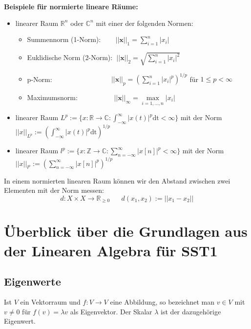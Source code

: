 \documentclass[11pt]{article}
\begin{document}
\textbf{Beispiele für normierte lineare Räume:}
\vspace*{-0.5cm}
\begin{itemize}
    \item linearer Raum $\mathbb{R}^n$ oder $\mathbb{C}^n$ mit einer der folgenden Normen: \begin{itemize}
        \item[] Summennorm (1-Norm): $\hspace{22pt}||\mathbf{x}||_1 = \sum_{i=1}^n |x_i|$
        \item[] Euklidische Norm (2-Norm): $\hspace{3pt}||\mathbf{x}||_2 = \sqrt{\sum_{i=1}^n |x_i|^2}$
        \item[] p-Norm: $\hspace{100pt}||\mathbf{x}||_p = \left(\sum_{i=1}^n |x_i|^p\right)^{1/p}$ für $1\leq p < \infty$
        \item[] Maximumsnorm: $\hspace{60pt}||\mathbf{x}||_\infty = \underset{i=1,\dots,n}{\max}|x_i|$
    \end{itemize}
    \item linearer Raum $L^p := \{ x:\mathbb{R}\to \mathbb{C} : \int_{-\infty}^\infty |x(t)|^p \text{dt} < \infty \} $ mit der Norm $||x||_{L^p} := \left( \int_{-\infty}^\infty |x(t)|^p \text{dt}\right)^{1/p}$
    \item linearer Raum $l^p :=\{ x:\mathbb{Z}\to \mathbb{C} : \sum_{n=-\infty}^\infty |x[n]|^p < \infty \} $ mit der Norm $||x||_{l^p} := \left( \sum_{n=-\infty}^\infty |x[n]|^p \right)^{1/p}$
\end{itemize}

In einem normierten linearen Raum können wir den Abstand zwischen zwei Elementen mit der Norm messen:
$$d:X\times X \to \mathbb{R}_{\geq 0} \hspace{20pt} d(x_1, x_2):= ||x_1 - x_2||$$

\vfill \null
\pagebreak

\section*{Überblick über die Grundlagen aus der Linearen Algebra für SST1}
\vspace*{-0.5cm}
\subsection*{Eigenwerte}
\vspace*{-0.5cm}
Ist $V$ ein Vektorraum und $f:V \to V$ eine Abbildung, so bezeichnet man  $v \in V$ mit $v \neq 0$ für $f(v) = \lambda v$ als Eigenvektor. Der Skalar $\lambda$ ist der dazugehörige Eigenwert.
\end{document}
